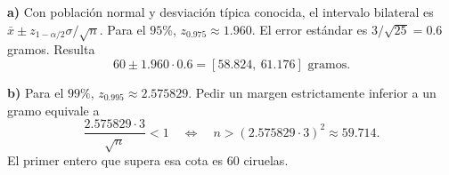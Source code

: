 \textbf{a)} Con población normal y desviación típica conocida,
el intervalo bilateral es $\bar x\pm z_{1-\alpha/2}\sigma/\sqrt n$.
Para el $95\%$, $z_{0.975}\approx1.960$. El error estándar es
$3/\sqrt{25}=0.6$ gramos. Resulta
\[
60\pm 1.960\cdot0.6=\boxed{[58.824,\ 61.176]\text{ gramos}}.
\]

\textbf{b)} Para el $99\%$, $z_{0.995}\approx2.575829$.
Pedir un margen estrictamente inferior a un gramo equivale a
\[
\frac{2.575829\cdot3}{\sqrt n}<1
\quad\Longleftrightarrow\quad n>(2.575829\cdot3)^2\approx59.714.
\]
El primer entero que supera esa cota es $\boxed{60}$ ciruelas.

